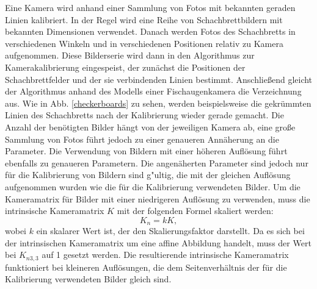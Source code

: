 \documentclass[arbeit=studie,oneside,BCOR=12mm]{ArbeitRST}
\begin{document}
Eine Kamera wird anhand einer Sammlung von Fotos mit bekannten geraden Linien
kalibriert. In der Regel wird eine Reihe von Schachbrettbildern mit bekannten
Dimensionen verwendet. \cite{addison} Danach werden Fotos des Schachbretts in verschiedenen
Winkeln und in verschiedenen Positionen relativ zu Kamera aufgenommen. Diese Bilderserie
wird dann in den Algorithmus zur Kamerakalibrierung eingespeist, der zunächst
die Positionen der Schachbrettfelder und der sie verbindenden Linien bestimmt.
Anschließend gleicht der Algorithmus anhand des Modells einer Fischaugenkamera
die Verzeichnung aus. Wie in Abb. \ref{checkerboards} zu sehen, werden
beispielsweise die gekrümmten Linien des Schachbretts nach der Kalibrierung
wieder gerade gemacht. Die Anzahl der benötigten Bilder hängt von der
jeweiligen Kamera ab, eine große Sammlung von Fotos führt jedoch zu einer
genaueren Annäherung an die Parameter.  Die Verwendung von
Bildern mit einer höheren Auflösung führt ebenfalls zu genaueren Parametern.
\cite{addison} Die angenäherten Parameter sind jedoch nur für die
Kalibrierung von Bildern sind g"ultig, die mit der gleichen Auflösung aufgenommen
wurden wie die für die Kalibrierung verwendeten Bilder. Um die Kameramatrix für
Bilder mit einer niedrigeren Auflösung zu verwenden, muss die intrinsische
Kameramatrix $K$ mit der folgenden Formel skaliert werden: 
\begin{equation} 
    K_n = k K, 
\end{equation} 
wobei $k$ ein skalarer Wert ist, der den Skalierungsfaktor darstellt. Da es
sich bei der intrinsischen Kameramatrix um eine affine Abbildung handelt, muss
der Wert bei $K_{n3, 3}$ auf 1 gesetzt werden. Die resultierende intrinsische
Kameramatrix funktioniert bei kleineren Auflösungen, die dem Seitenverhältnis
der für die Kalibrierung verwendeten Bilder gleich sind. 

\end{document}
